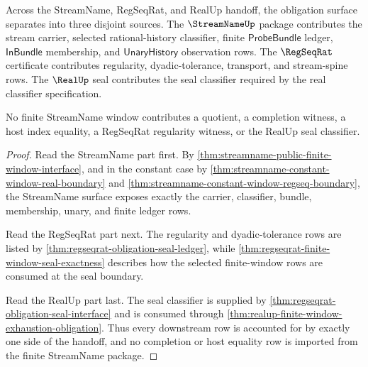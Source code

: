 \begin{theorem}
\label{thm:streamname-real-regseq-obligation-separation}
Across the StreamName, RegSeqRat, and RealUp handoff, the obligation surface
separates into three disjoint sources. The $\StreamNameUp$ package contributes
the stream carrier, selected rational-history classifier, finite
$\mathsf{ProbeBundle}$ ledger, $\mathsf{InBundle}$ membership, and
$\mathsf{UnaryHistory}$ observation rows. The $\RegSeqRat$ certificate
contributes regularity, dyadic-tolerance, transport, and stream-spine rows. The
$\RealUp$ seal contributes the seal classifier required by the real
classifier specification.

No finite StreamName window contributes a quotient, a completion witness, a
host index equality, a RegSeqRat regularity witness, or the RealUp seal
classifier.
\end{theorem}
\begin{proof}
Read the StreamName part first. By
\autoref{thm:streamname-public-finite-window-interface}, and in the constant
case by \autoref{thm:streamname-constant-window-real-boundary} and
\autoref{thm:streamname-constant-window-regseq-boundary}, the StreamName
surface exposes exactly the carrier, classifier, bundle, membership, unary, and
finite ledger rows.

Read the RegSeqRat part next. The regularity and dyadic-tolerance rows are
listed by \autoref{thm:regseqrat-obligation-seal-ledger}, while
\autoref{thm:regseqrat-finite-window-seal-exactness} describes how the selected
finite-window rows are consumed at the seal boundary.

Read the RealUp part last. The seal classifier is supplied by
\autoref{thm:regseqrat-obligation-seal-interface} and is consumed through
\autoref{thm:realup-finite-window-exhaustion-obligation}. Thus every downstream
row is accounted for by exactly one side of the handoff, and no completion or
host equality row is imported from the finite StreamName package.
\end{proof}


